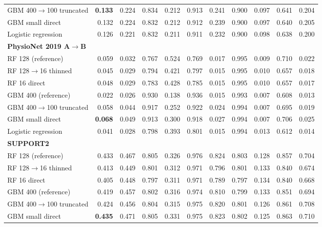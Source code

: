 {\begin{longtable}{lrrrrrrrrrr}
\quad GBM 400$\rightarrow$100 truncated & \textbf{0.133} & 0.224 & 0.834 & 0.212 & 0.913 & 0.241 & 0.900 & 0.097 & 0.641 & 0.204 \\
\quad GBM small direct & 0.132 & 0.224 & 0.832 & 0.212 & 0.912 & 0.239 & 0.900 & 0.097 & 0.640 & 0.205 \\
\quad Logistic regression & 0.126 & 0.221 & 0.832 & 0.211 & 0.911 & 0.232 & 0.900 & 0.098 & 0.638 & 0.200 \\
\midrule
\multicolumn{11}{l}{\textbf{PhysioNet 2019 A$\rightarrow$B}} \\*
\quad RF 128 (reference) & 0.059 & 0.032 & 0.767 & 0.524 & 0.769 & 0.017 & 0.995 & 0.009 & 0.710 & 0.022 \\
\quad RF 128$\rightarrow$16 thinned & 0.045 & 0.029 & 0.794 & 0.421 & 0.797 & 0.015 & 0.995 & 0.010 & 0.657 & 0.018 \\
\quad RF 16 direct & 0.048 & 0.029 & 0.783 & 0.428 & 0.785 & 0.015 & 0.995 & 0.010 & 0.657 & 0.017 \\
\quad GBM 400 (reference) & 0.022 & 0.026 & 0.930 & 0.138 & 0.936 & 0.015 & 0.993 & 0.007 & 0.608 & 0.013 \\
\quad GBM 400$\rightarrow$100 truncated & 0.058 & 0.044 & 0.917 & 0.252 & 0.922 & 0.024 & 0.994 & 0.007 & 0.695 & 0.019 \\
\quad GBM small direct & \textbf{0.068} & 0.049 & 0.913 & 0.300 & 0.918 & 0.027 & 0.994 & 0.007 & 0.706 & 0.025 \\
\quad Logistic regression & 0.041 & 0.028 & 0.798 & 0.393 & 0.801 & 0.015 & 0.994 & 0.013 & 0.612 & 0.014 \\
\midrule
\multicolumn{11}{l}{\textbf{SUPPORT2}} \\*
\quad RF 128 (reference) & 0.433 & 0.467 & 0.805 & 0.326 & 0.976 & 0.824 & 0.803 & 0.128 & 0.857 & 0.704 \\
\quad RF 128$\rightarrow$16 thinned & 0.413 & 0.449 & 0.801 & 0.312 & 0.971 & 0.796 & 0.801 & 0.133 & 0.840 & 0.674 \\
\quad RF 16 direct & 0.405 & 0.448 & 0.797 & 0.311 & 0.971 & 0.789 & 0.797 & 0.134 & 0.840 & 0.668 \\
\quad GBM 400 (reference) & 0.419 & 0.457 & 0.802 & 0.316 & 0.974 & 0.810 & 0.799 & 0.133 & 0.851 & 0.694 \\
\quad GBM 400$\rightarrow$100 truncated & 0.424 & 0.456 & 0.804 & 0.315 & 0.975 & 0.820 & 0.801 & 0.126 & 0.861 & 0.708 \\
\quad GBM small direct & \textbf{0.435} & 0.471 & 0.805 & 0.331 & 0.975 & 0.823 & 0.802 & 0.125 & 0.863 & 0.710 \\

\end{longtable}}
